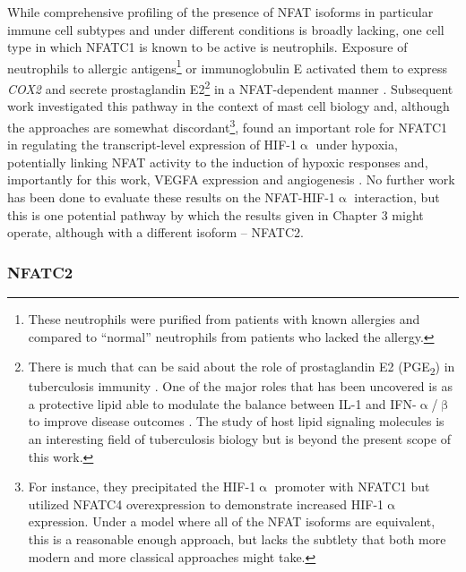 While comprehensive profiling of the presence of NFAT isoforms in particular immune cell subtypes and under different conditions is broadly lacking, one cell type in which NFATC1 is known to be active is neutrophils. Exposure of neutrophils to allergic antigens\footnote{These neutrophils were purified from patients with known allergies and compared to ``normal'' neutrophils from patients who lacked the allergy.} or immunoglobulin E activated them to express \textit{COX2} and secrete prostaglandin E2\footnote{There is much that can be said about the role of prostaglandin E2 (PGE\textsubscript{2}) in tuberculosis immunity \citep{Serhan2008}. One of the major roles that has been uncovered is as a protective lipid able to modulate the balance between IL\hyp{}1 and IFN\hyp{}$\upalpha$/$\upbeta$ to improve disease outcomes \citep{MayerBarber2014}. The study of host lipid signaling molecules is an interesting field of tuberculosis biology but is beyond the present scope of this work.} in a NFAT\hyp{}dependent manner \citep{Vega2007}. Subsequent work investigated this pathway in the context of mast cell biology and, although the approaches are somewhat discordant\footnote{For instance, they precipitated the HIF\hyp{}1$\upalpha$ promoter with NFATC1 but utilized NFATC4 overexpression to demonstrate increased HIF\hyp{}1$\upalpha$ expression. Under a model where all of the NFAT isoforms are equivalent, this is a reasonable enough approach, but lacks the subtlety that both more modern and more classical approaches might take.}, found an important role for NFATC1 in regulating the transcript\hyp{}level expression of HIF\hyp{}1$\upalpha$ under hypoxia, potentially linking NFAT activity to the induction of hypoxic responses and, importantly for this work, VEGFA expression and angiogenesis \citep{WalczakDrzewiecka2008}. No further work has been done to evaluate these results on the NFAT\hyp{}HIF\hyp{}1$\upalpha$ interaction, but this is one potential pathway by which the results given in Chapter 3 might operate, although with a different isoform -- NFATC2.

\subsubsection{NFATC2}\label{nfatc2}

